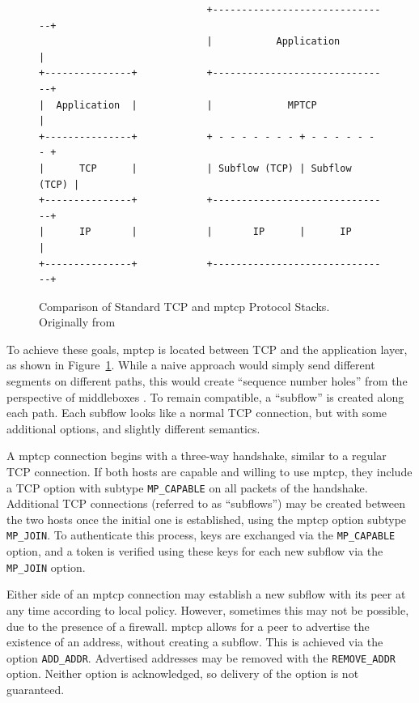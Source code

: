 \documentclass{cwru}
\begin{document}
\begin{figure}[h]
  \centering
\begin{BVerbatim}
                             +-------------------------------+
                             |           Application         |
+---------------+            +-------------------------------+
|  Application  |            |             MPTCP             |
+---------------+            + - - - - - - - + - - - - - - - +
|      TCP      |            | Subflow (TCP) | Subflow (TCP) |
+---------------+            +-------------------------------+
|      IP       |            |       IP      |      IP       |
+---------------+            +-------------------------------+
\end{BVerbatim}
\caption[Comparison of TCP and \acs{mptcp} Protocol Stacks]{Comparison of
  Standard TCP and \ac{mptcp} Protocol Stacks. Originally from \cite{rfc6824}}
  \label{fig:layers}
\end{figure}

To achieve these goals, \ac{mptcp} is located between TCP and the application
layer, as shown in Figure~\ref{fig:layers}. While a naive approach would simply
send different segments on different paths, this would create ``sequence
number holes'' from the perspective of middleboxes \cite{raiciu2012hard}. To
remain compatible, a ``subflow'' is created along each path. Each subflow looks
like a normal TCP connection, but with some additional options, and slightly
different semantics.

A \ac{mptcp} connection begins with a three-way handshake, similar to a regular
TCP connection. If both hosts are capable and willing to use \ac{mptcp}, they
include a TCP option with subtype \texttt{MP\_CAPABLE} on all packets of the
handshake. Additional TCP connections (referred to as ``subflows'') may be
created between the two hosts once the initial one is established, using the
\ac{mptcp} option subtype \texttt{MP\_JOIN}. To authenticate this process, keys
are exchanged via the \texttt{MP\_CAPABLE} option, and a token is verified using
these keys for each new subflow via the \texttt{MP\_JOIN} option.

Either side of an \ac{mptcp} connection may establish a new subflow with its
peer at any time according to local policy. However, sometimes this may not be
possible, due to the presence of a firewall. \ac{mptcp} allows for a peer to
advertise the existence of an address, without creating a subflow. This is
achieved via the option \texttt{ADD\_ADDR}. Advertised addresses may be removed
with the \texttt{REMOVE\_ADDR} option. Neither option is acknowledged, so
delivery of the option is not guaranteed.
\end{document}
